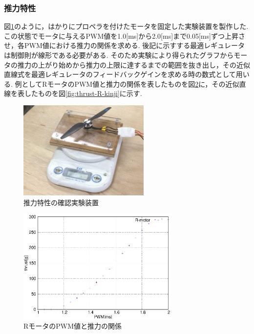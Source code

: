 \documentclass[12pt,oneside]{sotsuken_paper}
\begin{document}
\subsubsection{推力特性}
図\ref{fig:thrust-test}のように，はかりにプロペラを付けたモータを固定した実験装置を製作した.
この状態でモータに与えるPWM値を1.0[ms]から2.0[ms]まで0.05[ms]ずつ上昇させ，各PWM値における推力の関係を求める.
後記に示すする最適レギュレータは制御則が線形である必要がある.
そのため実験により得られたグラフからモータの推力の上がり始めから推力の上限に達するまでの範囲を抜き出し，その近似直線式を最適レギュレータのフィードバックゲインを求める時の数式として用いる.
例としてRモータのPWM値と推力の関係を表したものを図\ref{fig:thrust-R}に，その近似直線を表したものを図\ref{fig:thrust-R-kinji}に示す.

\begin{figure}[htbp]
	\begin{center}
		\includegraphics[width=65mm]{image/thrust/thrust-test.jpg}
		\caption{推力特性の確認実験装置}
		\label{fig:thrust-test}
	\end{center}
\end{figure}

\begin{figure}[htbp]
	\begin{center}
		\includegraphics[width=80mm]{image/thrust/thrust-R.eps}
		\caption{RモータのPWM値と推力の関係}
		\label{fig:thrust-R}
	\end{center}
\end{figure}
\end{document}

